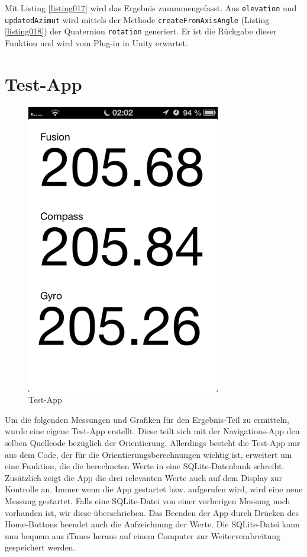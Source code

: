 Mit Listing \ref{listing017} wird das Ergebnis zusammengefasst. Aus \texttt{elevation} und \texttt{updatedAzimut} wird mittels der Methode \texttt{createFromAxisAngle} (Listing \ref{listing018}) der Quaternion \texttt{rotation} generiert. Er ist die Rückgabe dieser Funktion und wird vom Plug-in in Unity erwartet.

\section{Test-App}
\begin{figure}[htb]
\centering
\includegraphics[scale=0.6]{figures/testapp}
\caption{Test-App}
\label{fig:testapp001}
\end{figure}
Um die folgenden Messungen und Grafiken für den Ergebnis-Teil zu ermitteln, wurde eine eigene Test-App erstellt. Diese teilt sich mit der Navigations-App den selben Quellcode bezüglich der Orientierung. Allerdings besteht die Test-App nur aus dem Code, der für die Orientierungsberechnungen wichtig ist, erweitert um eine Funktion, die die berechneten Werte in eine SQLite-Datenbank schreibt. Zusätzlich zeigt die App die drei relevanten Werte auch auf dem Display zur Kontrolle an. Immer wenn die App gestartet bzw. aufgerufen wird, wird eine neue Messung gestartet. Falls eine SQLite-Datei von einer vorherigen Messung noch vorhanden ist, wir diese überschrieben. Das Beenden der App durch Drücken des Home-Buttons beendet auch die Aufzeichnung der Werte. Die SQLite-Datei kann nun bequem aus iTunes heraus auf einem Computer zur Weiterverabreitung gespeichert werden.

